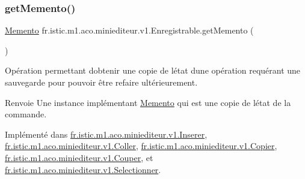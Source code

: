 \subsubsection{\texorpdfstring{get\+Memento()}{getMemento()}}
{\footnotesize\ttfamily \hyperlink{interfacefr_1_1istic_1_1m1_1_1aco_1_1miniediteur_1_1v1_1_1Memento}{Memento} fr.\+istic.\+m1.\+aco.\+miniediteur.\+v1.\+Enregistrable.\+get\+Memento (\begin{DoxyParamCaption}{ }\end{DoxyParamCaption})}



Opération permettant d\textquotesingle{}obtenir une copie de l\textquotesingle{}état d\textquotesingle{}une opération requérant une sauvegarde pour pouvoir être refaire ultérieurement. 

\begin{DoxyReturn}{Renvoie}
Une instance implémentant \hyperlink{interfacefr_1_1istic_1_1m1_1_1aco_1_1miniediteur_1_1v1_1_1Memento}{Memento} qui est une copie de l\textquotesingle{}état de la commande. 
\end{DoxyReturn}


Implémenté dans \hyperlink{classfr_1_1istic_1_1m1_1_1aco_1_1miniediteur_1_1v1_1_1Inserer_a4091c321237a04db9509b01e2baf768f}{fr.\+istic.\+m1.\+aco.\+miniediteur.\+v1.\+Inserer}, \hyperlink{classfr_1_1istic_1_1m1_1_1aco_1_1miniediteur_1_1v1_1_1Coller_a7ec61b1f6fcc322d4a3548e4e1461689}{fr.\+istic.\+m1.\+aco.\+miniediteur.\+v1.\+Coller}, \hyperlink{classfr_1_1istic_1_1m1_1_1aco_1_1miniediteur_1_1v1_1_1Copier_af7810fb486b49fcf6ca28958de33c7d0}{fr.\+istic.\+m1.\+aco.\+miniediteur.\+v1.\+Copier}, \hyperlink{classfr_1_1istic_1_1m1_1_1aco_1_1miniediteur_1_1v1_1_1Couper_aa4f63cd2eb49ae3b96f175989d93c338}{fr.\+istic.\+m1.\+aco.\+miniediteur.\+v1.\+Couper}, et \hyperlink{classfr_1_1istic_1_1m1_1_1aco_1_1miniediteur_1_1v1_1_1Selectionner_a93bb9249ee51f501735f6b40d77dc3f3}{fr.\+istic.\+m1.\+aco.\+miniediteur.\+v1.\+Selectionner}.

\mbox{\label{interfacefr_1_1istic_1_1m1_1_1aco_1_1miniediteur_1_1v1_1_1Enregistrable_a949bb6784743800c2d743def265f41b1}} 
